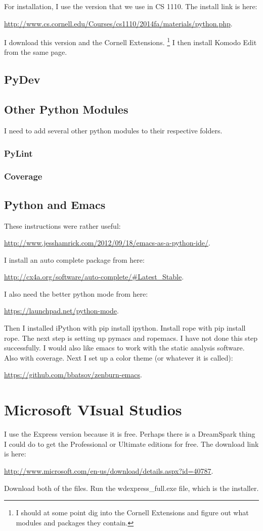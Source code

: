 \documentclass{article}
\newcommand{\web}[2]{
	\begin{center}
		\url{#1}{#2}
	\end{center}
}
\begin{document}
For installation, I use the version that we use in CS 1110.
The install link is here:
	\web{http://www.cs.cornell.edu/Courses/cs1110/2014fa/materials/python.php}.
I download this version and the Cornell Extensions.
\footnote{
	I should at some point dig into the Cornell Extensions and figure out what modules and packages
		they contain.
}
I then install Komodo Edit from the same page.

\subsection{PyDev}
\label{subsec:PyDev}

\subsection{Other Python Modules}

I need to add several other python modules to their respective folders.

\subsubsection{PyLint}

\subsubsection{Coverage}

\subsection{Python and Emacs}

These instructions were rather useful:
	\web{http://www.jesshamrick.com/2012/09/18/emacs-as-a-python-ide/}.
I install an auto complete package from here:
	\web{http://cx4a.org/software/auto-complete/\#Latest_Stable}.
I also need the better python mode from here:
	\web{https://launchpad.net/python-mode}.
Then I installed iPython with pip install ipython.
Install rope with pip install rope.
The next step is setting up pymacs and ropemacs.
I have not done this step successfully.
I would also like emacs to work with the static analysis software.
Also with coverage.
Next I set up a color theme (or whatever it is called):
	\web{https://github.com/bbatsov/zenburn-emacs}.

\section{Microsoft VIsual Studios}

I use the Express version because it is free.
Perhaps there is a DreamSpark thing I could do to get the Professional or Ultimate editions for free.
The download link is here:
	\web{http://www.microsoft.com/en-us/download/details.aspx?id=40787}.
Download both of the files.
Run the wdexpress\_full.exe file, which is the installer.
\end{document}
